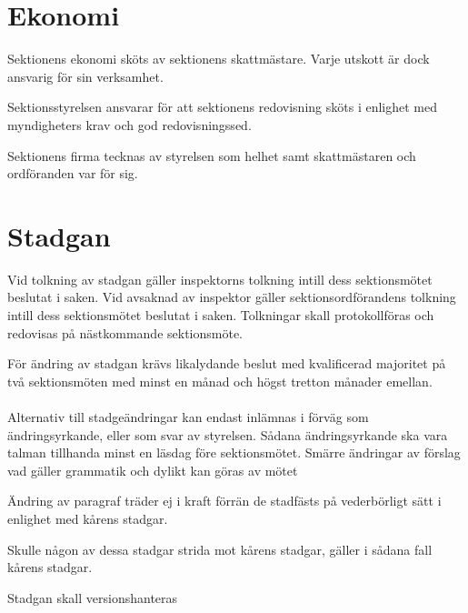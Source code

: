 \documentclass[stadgar]{dsekprotokoll}
\begin{document}
\section{Ekonomi}

\begin{stadgeavsnitt}


Sektionens ekonomi sköts av sektionens skattmästare. Varje utskott är dock
ansvarig för sin verksamhet.


Sektionsstyrelsen ansvarar för att sektionens redovisning sköts i enlighet
med myndigheters krav och god redovisningssed.


Sektionens firma tecknas av styrelsen som helhet samt skattmästaren och ordföranden
var för sig.

\end{stadgeavsnitt}

\section{Stadgan}

\begin{stadgeavsnitt}


Vid tolkning av stadgan gäller inspektorns tolkning intill dess
sektionsmötet beslutat i saken. Vid avsaknad av inspektor gäller
sektionsordförandens tolkning intill dess sektionsmötet beslutat i saken.
Tolkningar skall protokollföras och redovisas på nästkommande
sektionsmöte.


För ändring av stadgan krävs likalydande beslut med kvalificerad majoritet
på två sektionsmöten med minst en månad och högst tretton månader emellan.
\\\\
Alternativ till stadgeändringar kan endast inlämnas i förväg som ändringsyrkande, eller som svar av styrelsen. Sådana ändringsyrkande ska vara talman tillhanda minst en läsdag före sektionsmötet. Smärre ändringar av förslag vad gäller grammatik och dylikt kan göras av mötet


Ändring av paragraf träder ej i kraft förrän de stadfästs på vederbörligt
sätt i enlighet med kårens stadgar.


Skulle någon av dessa stadgar strida mot kårens stadgar, gäller i sådana
fall kårens stadgar.

Stadgan skall versionshanteras

\end{stadgeavsnitt}
\end{document}
